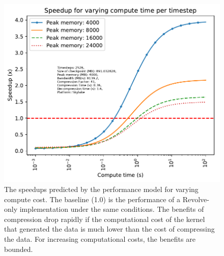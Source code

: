 \documentclass[conference]{IEEEtran}
\begin{document}
\begin{figure}
\begin{center}
\includegraphics[width=\linewidth]{images/varying-compute.pdf}
\end{center}
\caption{The speedups predicted by the performance model for varying
  compute cost. The baseline
(1.0) is the performance of a Revolve-only implementation under the
same conditions. The benefits of compression drop rapidly if the
computational cost of the kernel that generated the data is much lower
than the cost of compressing the data. For increasing computational
costs, the benefits are bounded.}
\label{fig:varying_compute}
\end{figure}
\end{document}
